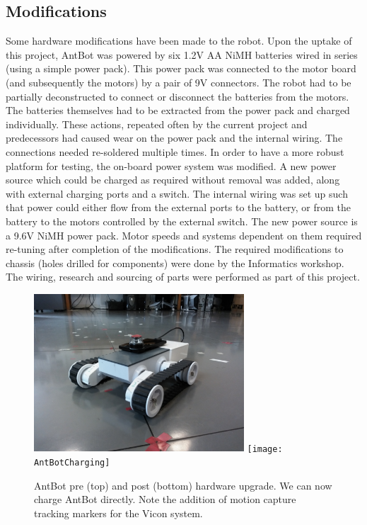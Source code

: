 \documentclass[a4paper,11pt,twoside,openright]{article}
\begin{document}
\subsection{Modifications}
Some hardware modifications have been made to the robot. Upon the uptake of this project, AntBot
was powered by six 1.2V AA NiMH batteries wired in series (using a simple power pack). This power
pack was connected to the motor board (and subsequently the motors) by a pair of 9V connectors. The robot
had to be partially deconstructed to connect or disconnect the batteries from the motors. The batteries themselves
had to be extracted from the power pack and charged individually. These actions, repeated often by the current
project and predecessors had caused wear on the power pack and the internal wiring. The connections
needed re-soldered multiple times. In order to have a more robust platform for testing, the on-board
power system was modified. 
A new power source which could be charged as required without removal was added, along with external
charging ports and a switch. The internal wiring was set up such that power could either flow from the
external ports to the battery, or from the battery to the motors controlled by the external switch. The new
power source is a 9.6V NiMH power pack. Motor speeds and systems dependent on them required re-tuning
after completion of the modifications. The required modifications to chassis (holes drilled for components)
were done by the Informatics workshop. The wiring, research and sourcing of parts were performed as part
of this project.

\begin{figure}
  \centering
  \includegraphics[width=0.7\textwidth]{AntBot}
  \texttt{[image: AntBotCharging]}
  \caption{
    \label{fig:antbotcomp} AntBot pre (top) and post (bottom) hardware upgrade. We can now charge
    AntBot directly. Note the addition of motion capture tracking markers for the Vicon system.
    }
\end{figure}
\newpage
\end{document}
